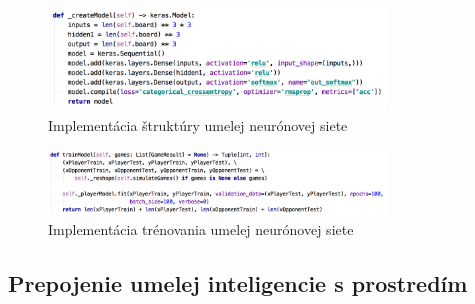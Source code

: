\begin{figure}[H]
    \centering
    \includegraphics[width=0.8\textwidth]{images/impl-ann-model.jpg}
    \caption{Implementácia štruktúry umelej neurónovej siete}
\end{figure}\label{figure:ann-model-impl}

\begin{figure}[H]
    \centering
    \includegraphics[width=0.8\textwidth]{images/impl-ann-train.jpg}
    \caption{Implementácia trénovania umelej neurónovej siete}
\end{figure}\label{figure:ann-train-impl}

\subsection{Prepojenie umelej inteligencie s prostredím}\label{subsec:connection}

